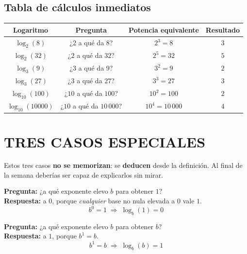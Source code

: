 \documentclass[11pt,a4paper]{article}
\begin{document}
\subsection{Tabla de cálculos inmediatos}

\begin{center}
\begin{tabular}{@{}cccc@{}}
\toprule
\textbf{Logaritmo} & \textbf{Pregunta} & \textbf{Potencia equivalente} & \textbf{Resultado} \\
\midrule
$\log_2(8)$    & ¿$2$ a qué da $8$?     & $2^{3} = 8$      & $3$ \\
$\log_2(32)$   & ¿$2$ a qué da $32$?    & $2^{5} = 32$     & $5$ \\
$\log_3(9)$    & ¿$3$ a qué da $9$?     & $3^{2} = 9$      & $2$ \\
$\log_3(27)$   & ¿$3$ a qué da $27$?    & $3^{3} = 27$     & $3$ \\
$\log_{10}(100)$ & ¿$10$ a qué da $100$? & $10^{2} = 100$  & $2$ \\
$\log_{10}(10000)$ & ¿$10$ a qué da $10\,000$? & $10^{4} = 10\,000$ & $4$ \\
\bottomrule
\end{tabular}
\end{center}

\section{TRES CASOS ESPECIALES}

Estos tres casos \textbf{no se memorizan}: se \textbf{deducen} desde la definición. Al final de la semana deberías ser capaz de explicarlos sin mirar.

\begin{tcolorbox}[propiedad, title={Caso 1: $\log_b(1) = 0$}]
\textbf{Pregunta:} ¿a qué exponente elevo $b$ para obtener $1$?\\
\textbf{Respuesta:} a $0$, porque \emph{cualquier} base no nula elevada a $0$ vale $1$.
\[
  b^{0} = 1 \;\Longrightarrow\; \log_b(1) = 0
\]
\end{tcolorbox}

\begin{tcolorbox}[propiedad, title={Caso 2: $\log_b(b) = 1$}]
\textbf{Pregunta:} ¿a qué exponente elevo $b$ para obtener $b$?\\
\textbf{Respuesta:} a $1$, porque $b^{1} = b$.
\[
  b^{1} = b \;\Longrightarrow\; \log_b(b) = 1
\]
\end{tcolorbox}
\end{document}
